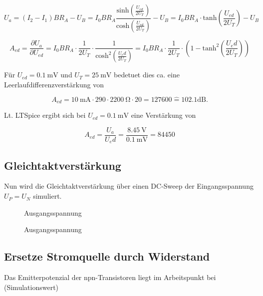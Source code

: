 \begin{equation}
    U_a = ( I_2 - I_1 ) B R_A - U_B = I_0BR_A \frac{\text{sinh}\left( \frac{U_{ed}}{2U_T}  \right)}{\text{cosh}\left( \frac{U_{ed}}{2U_T}  \right)} - U_B = I_0BR_A \cdot \text{tanh}\left( \frac{U_{ed}}{2U_T} \right) - U_B
\end{equation}

\begin{equation}
    A_{ed} = \frac{\partial U_a}{\partial U_{ed}} = I_0BR_A \cdot \frac{1}{2U_T} \cdot \frac{1}{\text{cosh}^2\left( \frac{U_ed}{2U_T}  \right)} = I_0BR_A \cdot \frac{1}{2U_T} \cdot \left( 1 - \text{tanh}^2\left(\frac{U_ed}{2U_T} \right) \right)
\end{equation}

Für $U_{ed} = \SI{0.1}{\milli\volt}$ und $U_T = \SI{25}{\milli\volt}$ bedetuet dies ca. eine Leerlaufdifferenzverstärkung von

\begin{equation}
    A_{ed} = \SI{10}{\milli\ampere} \cdot 290 \cdot \SI{2200}{\ohm} \cdot 20 = 127600 \hat{=} 102.1 \text{dB} .
\end{equation}

Lt. LTSpice ergibt sich bei $U_{ed} = \SI{0.1}{\milli\volt}$ eine Verstärkung von

\begin{equation}
    A_{ed} = \frac{U_a}{U_ed} = \frac{\SI{8.45}{\volt}}{\SI{0.1}{\milli\volt}} = 84 450
\end{equation}

\subsection{Gleichtaktverstärkung}
Nun wird die Gleichtaktverstärkung über einen DC-Sweep der Eingangsspannung $U_P = U_N$ simuliert.

\begin{figure}[H]
	\centering \small
	\scalebox{0.9}{}
	\caption{Ausgangsspannung}
	\label{fig_Kap5_16:transfer}
\end{figure}

\begin{figure}[H]
	\centering \small
	\scalebox{0.9}{}
	\caption{Ausgangsspannung}
	\label{fig_Kap5_17:transfer}
\end{figure}

\subsection{Ersetze Stromquelle durch Widerstand}
Das Emitterpotenzial der npn-Transistoren liegt im Arbeitspunkt bei (Simulationswert)

